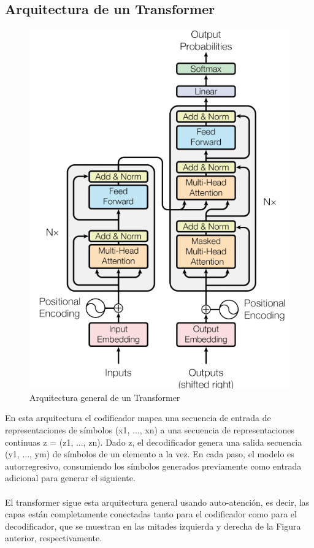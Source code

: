 \documentclass[12pt, a4paper, titlepage]{report}
\begin{document}
		   		\subsection{Arquitectura de un Transformer} 
		   		
		   		\begin{figure}[H] \caption{Arquitectura general de un Transformer \cite{refArqTransformer}}
		   			\includegraphics[width=12cm]{./imagenes/MarcoTeorico/Transformerarchitecture.png}
		   			\centering 
		   		\end{figure}     
		        En esta arquitectura el codificador mapea una secuencia de entrada de representaciones de símbolos (x1, ..., xn) a una secuencia de representaciones continuas z = (z1, ..., zn). Dado z, el decodificador genera una salida secuencia (y1, ..., ym) de símbolos de un elemento a la vez. En cada paso, el modelo es autorregresivo, consumiendo los símbolos generados previamente como entrada adicional para generar el siguiente.\\\\
		        El transformer sigue esta arquitectura general usando auto-atención, es decir, las capas están completamente conectadas tanto para el codificador como para el decodificador, que se muestran en las mitades izquierda y derecha de la Figura anterior, respectivamente. \cite{refArqTransformer}
        
\end{document}
